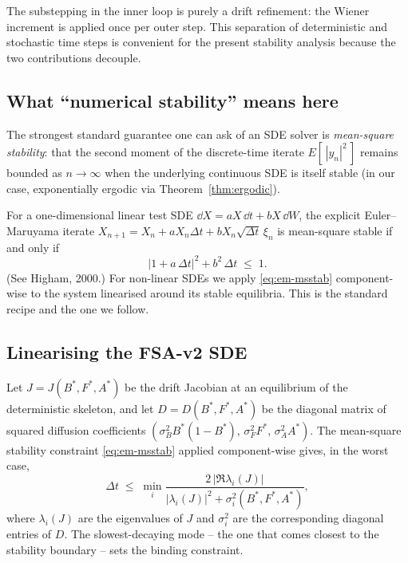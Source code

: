 The substepping in the inner loop is purely a drift refinement: the
Wiener increment is applied once per outer step. This separation of
deterministic and stochastic time steps is convenient for the
present stability analysis because the two contributions decouple.

\subsection{What ``numerical stability'' means here}\label{sec:num-stab-def}

The strongest standard guarantee one can ask of an SDE solver is
\emph{mean-square stability}: that the second moment of the
discrete-time iterate $E[\,|y_n|^2\,]$ remains bounded as
$n \to \infty$ when the underlying continuous SDE is itself stable
(in our case, exponentially ergodic via Theorem~\ref{thm:ergodic}).

For a one-dimensional linear test SDE
$\dd X = a X\,\dd t + b X\,\dd W$, the explicit Euler--Maruyama
iterate $X_{n+1} = X_n + a X_n \Delta t + b X_n \sqrt{\Delta t}\,\xi_n$
is mean-square stable if and only if
\begin{equation}
  |1 + a\,\Delta t|^2 + b^2\,\Delta t \;\le\; 1.
  \label{eq:em-msstab}
\end{equation}
(See Higham, 2000.) For non-linear SDEs we apply
\eqref{eq:em-msstab} component-wise to the system linearised around
its stable equilibria. This is the standard recipe and the one we
follow.

\subsection{Linearising the FSA-v2 SDE}\label{sec:num-stab-lin}

Let $J = J(B^*,F^*,A^*)$ be the drift Jacobian at an equilibrium of
the deterministic skeleton, and let $D = D(B^*,F^*,A^*)$ be the
diagonal matrix of squared diffusion coefficients
$(\sigma_B^2 B^*(1-B^*),\,\sigma_F^2 F^*,\,\sigma_A^2 A^*)$. The
mean-square stability constraint \eqref{eq:em-msstab} applied
component-wise gives, in the worst case,
\begin{equation}
  \Delta t \;\le\;
   \min_i \frac{2\,|\Re\lambda_i(J)|}
                {|\lambda_i(J)|^2 + \sigma_i^2(B^*,F^*,A^*)},
  \label{eq:dt-stable}
\end{equation}
where $\lambda_i(J)$ are the eigenvalues of $J$ and $\sigma_i^2$ are
the corresponding diagonal entries of $D$. The slowest-decaying
mode -- the one that comes closest to the stability boundary --
sets the binding constraint.

